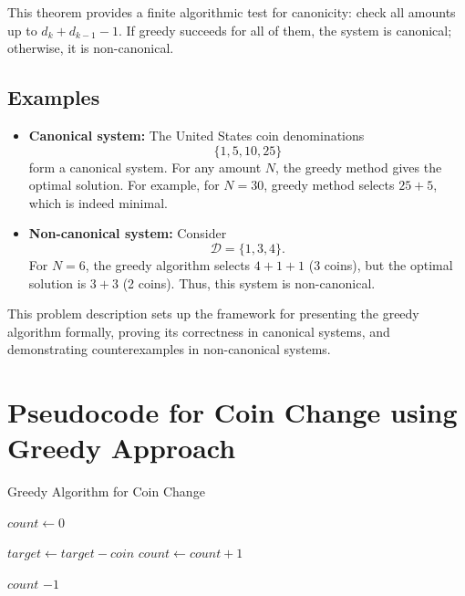 \documentclass[12pt,a4paper]{report}
\begin{document}
This theorem provides a finite algorithmic test for canonicity: check all amounts up to $d_k + d_{k-1} - 1$. If greedy succeeds for all of them, the system is canonical; otherwise, it is non-canonical.


\subsection*{Examples}

\begin{itemize}
    \item \textbf{Canonical system:} The United States coin denominations 
    \[
    \{1, 5, 10, 25\}
    \]
    form a canonical system. For any amount $N$, the greedy method gives the optimal solution. For example, for $N = 30$, greedy method selects $25 + 5$, which is indeed minimal.

    \item \textbf{Non-canonical system:} Consider 
    \[ \mathcal{D} = \{1, 3, 4\}.\] 
    For $N = 6$, the greedy algorithm selects $4 + 1 + 1$ (3 coins), but the optimal solution is $3 + 3$ (2 coins). Thus, this system is non-canonical.
\end{itemize}

This problem description sets up the framework for presenting the greedy algorithm formally, proving its correctness in canonical systems, and demonstrating counterexamples in non-canonical systems.


\section{Pseudocode for Coin Change using Greedy Approach}

\begin{algorithm}
\caption{Greedy Algorithm for Coin Change}
\begin{algorithmic}[1]
    \State {}
    \State $count \gets 0$ 
    
            \State $target \gets target - coin$ 
            \State $count \gets count + 1$ 
        \EndWhile
    \EndFor
    
        \State \Return $count$ 
    \Else
        \State \Return $-1$ 
    \EndIf
\EndProcedure
\end{algorithmic}
\end{algorithm}
\end{document}
